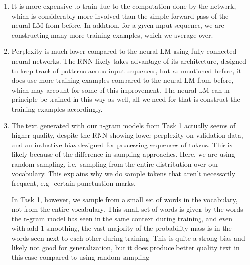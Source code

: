 \documentclass[11pt,a4paper]{article}
\begin{document}
\begin{enumerate}[label=(\alph*)]
    \item It is more expensive to train due to the computation done by the
          network, which is considerably more involved than the simple forward
          pass of the neural LM from before.
          In addition, for a given input sequence, we are constructing many
          more training examples, which we average over.
    \item Perplexity is much lower compared to the neural LM using
          fully-connected neural networks.
          The RNN likely takes advantage of its architecture, designed to keep
          track of patterns across input sequences, but as mentioned before, it
          does use more training examples compared to the neural LM from before,
          which may account for some of this improvement.
          The neural LM can in principle be trained in this way as well, all we
          need for that is construct the training examples accordingly.
    \item The text generated with our n-gram models from Task 1 actually seems
          of higher quality, despite the RNN showing lower perplexity on
          validation data, and an inductive bias designed for processing
          sequences of tokens.
          This is likely because of the difference in sampling approaches.
          Here, we are using random sampling, i.e.\ sampling from the entire
          distribution over our vocabulary.
          This explains why we do sample tokens that aren't necessarily
          frequent, e.g.\ certain punctuation marks.

          In Task 1, however, we sample from a small set of words in the
          vocabulary, not from the entire vocabulary.
          This small set of words is given by the words the n-gram model has
          seen in the same context during training, and even with add-1
          smoothing, the vast majority of the probability mass is in the words
          seen next to each other during training.
          This is quite a strong bias and likely not good for generalization,
          but it does produce better quality text in this case compared to
          using random sampling.


\end{enumerate}
\end{document}
